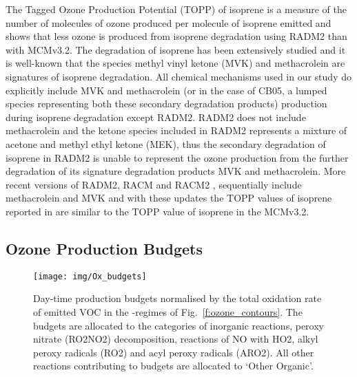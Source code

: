 The Tagged Ozone Production Potential (TOPP) of isoprene is a measure of the number of molecules of ozone produced per molecule of isoprene emitted and \citet{Coates:2015} shows that less ozone is produced from isoprene degradation using RADM2 than with MCMv3.2.
The degradation of isoprene has been extensively studied and it is well-known that the species methyl vinyl ketone (MVK) and methacrolein are signatures of isoprene degradation.
All chemical mechanisms used in our study do explicitly include MVK and methacrolein (or in the case of CB05, a lumped species representing both these secondary degradation products) production during isoprene degradation except RADM2.
RADM2 does not include methacrolein and the ketone species included in RADM2 represents a mixture of acetone and methyl ethyl ketone (MEK), thus the secondary degradation of isoprene in RADM2 is unable to represent the ozone production from the further degradation of its signature degradation products MVK and methacrolein.
More recent versions of RADM2, RACM \citep{Stockwell:1997} and RACM2 \citep{Goliff:2013}, sequentially include methacrolein and MVK and with these updates the TOPP values of isoprene reported in \citet{Coates:2015} are similar to the TOPP value of isoprene in the MCMv3.2.

\subsection{Ozone Production Budgets} \label{ss:r_budgets}

\begin{figure}[t]%
    \centering%
    \caption{Day-time  production budgets normalised by the total oxidation rate of emitted VOC in the -regimes of Fig.~\ref{f:ozone_contours}. The budgets are allocated to the categories of inorganic reactions, peroxy nitrate (RO2NO2) decomposition, reactions of NO with HO2, alkyl peroxy radicals (RO2) and acyl peroxy radicals (ARO2). All other reactions contributing to  budgets are allocated to `Other Organic'.}%
    \label{f:ozone_budgets}%
    \texttt{[image: img/Ox\_budgets]}
\end{figure}

